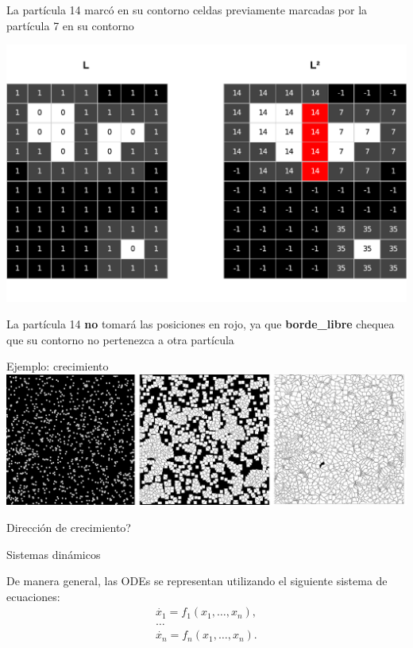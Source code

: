 \documentclass[spanish,unknownkeysallowed]{beamer}
\begin{document}
\begin{frame}
La partícula 14 marcó en su contorno celdas previamente marcadas por la partícula 7 en su contorno
\centerline{\includegraphics[scale = 0.45]{../figures/sistemaparticulas}}
La partícula 14 \textbf{no} tomará las posiciones en rojo, ya que \textbf{borde\_libre} chequea que su contorno no pertenezca a otra partícula
\end{frame}

\begin{frame}{Ejemplo: crecimiento}
\includegraphics[scale = 0.15]{../figures/modeladocrec}

\centering
Dirección de crecimiento?
\end{frame}


\begin{frame}{Sistemas dinámicos}

De manera general, las ODEs se representan utilizando el siguiente sistema de ecuaciones:
\begin{equation*}
  \begin{aligned}
    \dot{x_{1}} = f_{1}(x_{1},\ldots,x_{n}),\\
    \ldots\\
    \dot{x_{n}} = f_{n}(x_{1},\ldots,x_{n}).
  \end{aligned}
\end{equation*}



\end{frame}
\end{document}
